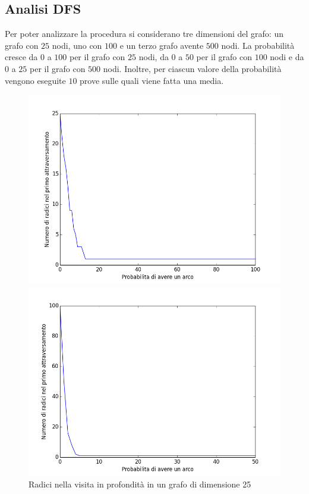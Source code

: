 \documentclass[11pt]{article}
\begin{document}
\subsection{Analisi DFS}
Per poter analizzare la procedura si considerano tre dimensioni del grafo: un grafo con $25$ nodi, uno con $100$ e un terzo grafo avente $500$ nodi. La probabilità cresce da $0$ a $100$ per il grafo con $25$ nodi, da $0$ a $50$ per il grafo con $100$ nodi e da $0$ a $25$ per il grafo con $500$ nodi. Inoltre, per ciascun valore della probabilità vengono eseguite $10$ prove sulle quali viene fatta una media.
\begin{figure}[p]
\includegraphics[scale=0.33,angle=0]{radici25.png}
\centering
\caption{Radici nella visita in profondità in un grafo di dimensione 25}
\label{radici25}
\includegraphics[scale=0.33,angle=0]{radici100.png}

\end{figure}
\end{document}

